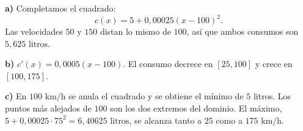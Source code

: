 \textbf{a)} Completamos el cuadrado:
\[
c(x)=5+0{,}00025(x-100)^2.
\]
Las velocidades $50$ y $150$ distan lo mismo de $100$, así que ambos consumos son $\boxed{5{,}625\text{ litros}}$.

\textbf{b)} $c'(x)=0{,}0005(x-100)$. El consumo decrece en $[25,100]$ y crece en $[100,175]$.

\textbf{c)} En $100$ km/h se anula el cuadrado y se obtiene el mínimo de $5$ litros. Los puntos más alejados de $100$ son los dos extremos del dominio. El máximo, $5+0{,}00025\cdot75^2=\boxed{6{,}40625\text{ litros}}$, se alcanza tanto a $25$ como a $175$ km/h.
